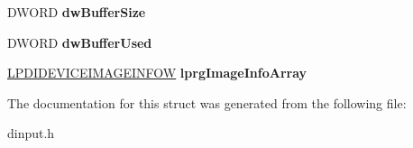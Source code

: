 \begin{DoxyCompactItemize}
\item 
\hypertarget{struct___d_i_d_e_v_i_c_e_i_m_a_g_e_i_n_f_o_h_e_a_d_e_r_w_afa53a70d8161d140dcb49a917f9d54cd}{D\-W\-O\-R\-D {\bfseries dw\-Buffer\-Size}}\label{struct___d_i_d_e_v_i_c_e_i_m_a_g_e_i_n_f_o_h_e_a_d_e_r_w_afa53a70d8161d140dcb49a917f9d54cd}

\item 
\hypertarget{struct___d_i_d_e_v_i_c_e_i_m_a_g_e_i_n_f_o_h_e_a_d_e_r_w_a54023301577002adcf9a7875a3a1e835}{D\-W\-O\-R\-D {\bfseries dw\-Buffer\-Used}}\label{struct___d_i_d_e_v_i_c_e_i_m_a_g_e_i_n_f_o_h_e_a_d_e_r_w_a54023301577002adcf9a7875a3a1e835}

\item 
\hypertarget{struct___d_i_d_e_v_i_c_e_i_m_a_g_e_i_n_f_o_h_e_a_d_e_r_w_a3562dc6959a1530e0a6c1975ec2f0ad9}{\hyperlink{struct___d_i_d_e_v_i_c_e_i_m_a_g_e_i_n_f_o_w}{L\-P\-D\-I\-D\-E\-V\-I\-C\-E\-I\-M\-A\-G\-E\-I\-N\-F\-O\-W} {\bfseries lprg\-Image\-Info\-Array}}\label{struct___d_i_d_e_v_i_c_e_i_m_a_g_e_i_n_f_o_h_e_a_d_e_r_w_a3562dc6959a1530e0a6c1975ec2f0ad9}

\end{DoxyCompactItemize}


The documentation for this struct was generated from the following file\-:\begin{DoxyCompactItemize}
\item 
dinput.\-h\end{DoxyCompactItemize}
